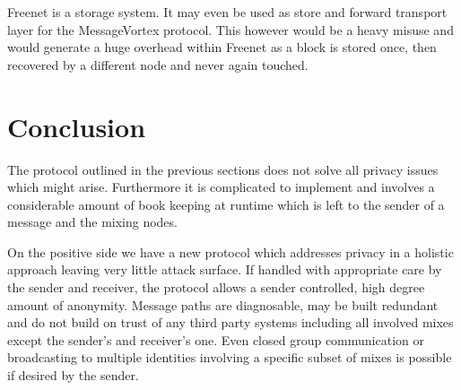 \documentclass[9pt,journal,compsoc]{IEEEtran}
\begin{document}
Freenet is a storage system. It may even be used as store and forward transport layer for the MessageVortex protocol. This however would be a heavy misuse and would generate a huge overhead  within Freenet as a block is stored once, then recovered by a different node and never again touched. 

\section{Conclusion}
The protocol outlined in the previous sections does not solve all privacy issues which might arise. Furthermore it is complicated to implement and involves a considerable amount of book keeping at runtime which is left to the sender of a message and the mixing nodes. 

On the positive side we have a new protocol which addresses privacy in a holistic approach leaving very little attack surface. If handled with appropriate care by the sender and receiver, the protocol allows a sender controlled, high degree amount of anonymity. Message paths are diagnosable, may be built redundant and do not build on trust of any third party systems including all involved mixes except the sender's and receiver's one. Even closed group communication or broadcasting to multiple identities involving a specific subset of mixes is possible if desired by the sender.


%
\end{document}

